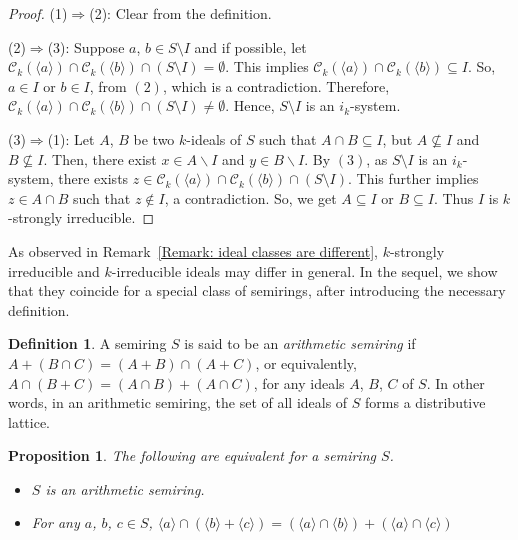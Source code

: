 \documentclass[11pt,english]{amsart}
\newtheorem{proposition}[theorem]{Proposition}
\theoremstyle{definition}
\newtheorem{definition}[theorem]{Definition}
\numberwithin{equation}{section}
\begin{document}
\begin{proof}
    (1)$\Rightarrow$(2): Clear from the definition. 

    
    (2)$\Rightarrow$(3): Suppose $a$, $b \in S\setminus I$ and if possible, let $\mathcal{C}_k(\langle a\rangle) \cap \mathcal{C}_k(\langle b\rangle) \cap (S \setminus I)= \emptyset$. This implies $\mathcal{C}_k(\langle a\rangle) \cap \mathcal{C}_k(\langle b\rangle) \subseteq I$. So, $a \in I$ or $b \in I$, from $(2)$, which is a contradiction. Therefore, $\mathcal{C}_k(\langle a\rangle) \cap \mathcal{C}_k(\langle b\rangle) \cap (S \setminus I) \neq \emptyset$. Hence, $S \setminus I$ is an $i_k$-system.

    
    (3)$ \Rightarrow $(1):
    Let $A$, $B$ be two $k$-ideals of $S$ such that $A \cap B \subseteq I$, but $A \nsubseteq I$ and $B \nsubseteq I$. Then, there exist $x \in A \backslash I$ and $y \in B \backslash I$. By $(3)$, as $S \setminus I$ is an $i_k$-system, there exists $z \in \mathcal{C}_k(\langle a\rangle) \cap \mathcal{C}_k(\langle b\rangle) \cap (S \setminus I)$. This further implies $z \in A \cap B$ such that $z \notin I$, a contradiction. So, we get $A \subseteq I$ or $B \subseteq I$. Thus $I$ is $k$-strongly irreducible.
\end{proof}

As observed in Remark~\ref{Remark: ideal classes are different}, $k$-strongly irreducible and $k$-irreducible ideals may differ in general. In the sequel, we show that they coincide for a special class of semirings, after introducing the necessary definition.

\begin{definition}\label{Definition: arithmetic semiring}
    A semiring $S$ is said to be an \emph{arithmetic semiring} if 
        $A+(B \cap C)= (A+B) \cap (A+C)$, or equivalently,  
        $A \cap (B+C)= (A \cap B)+(A \cap C)$, for any ideals $A$, $B$, $C$ of $S$. In other words, in an arithmetic semiring, the set of all ideals of  $S$ forms a distributive lattice.
    
\end{definition}

\begin{proposition}
    The following are equivalent for a semiring $S$.
    \begin{itemize}
        \item[1.] $S$ is an arithmetic semiring.
        \item[2.] For any $a$, $b$, $c\in S$, $\langle a\rangle\cap (\langle b\rangle +\langle c\rangle)=(\langle a\rangle \cap \langle b\rangle)+(\langle a\rangle\cap \langle c\rangle)$ 
    \end{itemize}
\end{proposition}
\end{document}
